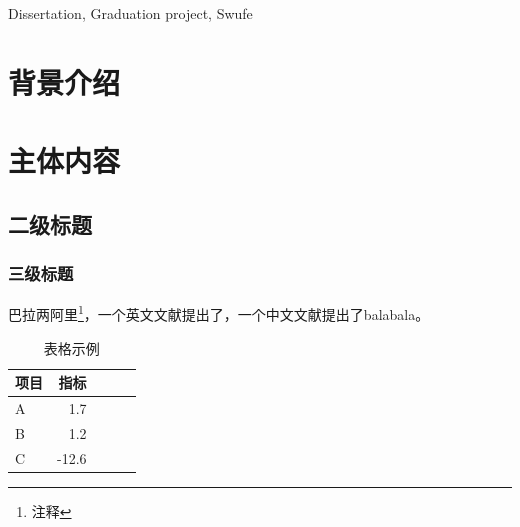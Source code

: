 \documentclass{swufethesis}
\begin{document}
\maketitle %
\statement %
\begin{abstract}{毕业论文, 毕业设计, 西南财经大学}
  \zhlipsum[1]
\end{abstract}

\begin{abstract*}{Dissertation, Graduation project, Swufe}
  \lipsum[1]
\end{abstract*}

\tableofcontents

\setcounter{page}{1}
\chapter{背景介绍}
\zhlipsum
\chapter{主体内容}

\section{二级标题}
\subsection{三级标题}
\zhlipsum[2-5]
巴拉两阿里\footnote{注释}，一个英文文献\cite{dirac}提出了，一个中文文献\cite{蔡敏2006--}提出了balabala。

\zhlipsum

\begin{table}[htb]
  \caption{表格示例}
  \centering
  \begin{tabular}{lrrrr}
    \toprule
    项目 & 指标  \\
    \midrule
    A    & 1.7   \\
    B    & 1.2   \\
    C    & -12.6 \\
    \bottomrule
  \end{tabular}
\end{table}

\zhlipsum
\end{document}
